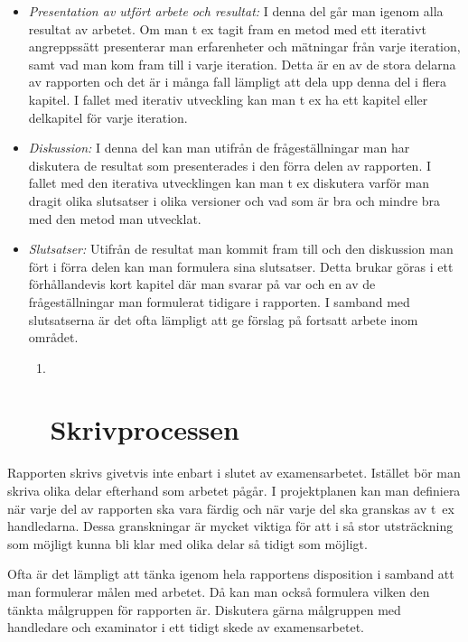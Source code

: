 \begin{itemize}
\item
  \emph{Presentation av utfört arbete och resultat:} I denna del går man
  igenom alla resultat av arbetet. Om man t ex tagit fram en metod med
  ett iterativt angreppssätt presenterar man erfarenheter och mätningar
  från varje iteration, samt vad man kom fram till i varje iteration.
  Detta är en av de stora delarna av rapporten och det är i många fall
  lämpligt att dela upp denna del i flera kapitel. I fallet med iterativ
  utveckling kan man t ex ha ett kapitel eller delkapitel för varje
  iteration.
\item
  \emph{Diskussion:} I denna del kan man utifrån de frågeställningar man
  har diskutera de resultat som presenterades i den förra delen av
  rapporten. I fallet med den iterativa utvecklingen kan man t ex
  diskutera varför man dragit olika slutsatser i olika versioner och vad
  som är bra och mindre bra med den metod man utvecklat.
\item
  \emph{Slutsatser:} Utifrån de resultat man kommit fram till och den
  diskussion man fört i förra delen kan man formulera sina slutsatser.
  Detta brukar göras i ett förhållandevis kort kapitel där man svarar på
  var och en av de frågeställningar man formulerat tidigare i rapporten.
  I samband med slutsatserna är det ofta lämpligt att ge förslag på
  fortsatt arbete inom området.

  \begin{enumerate}
  \def\labelenumi{\arabic{enumi}.}
  \item ~
    \section{Skrivprocessen }\label{skrivprocessen}
  \end{enumerate}
\end{itemize}

Rapporten skrivs givetvis inte enbart i slutet av examensarbetet.
Istället bör man skriva olika delar efterhand som arbetet pågår. I
projektplanen kan man definiera när varje del av rapporten ska vara
färdig och när varje del ska granskas av t~ex handledarna. Dessa
granskningar är mycket viktiga för att i så stor utsträckning som
möjligt kunna bli klar med olika delar så tidigt som möjligt.

Ofta är det lämpligt att tänka igenom hela rapportens disposition i
samband att man formulerar målen med arbetet. Då kan man också formulera
vilken den tänkta målgruppen för rapporten är. Diskutera gärna
målgruppen med handledare och examinator i ett tidigt skede av
examensarbetet.

